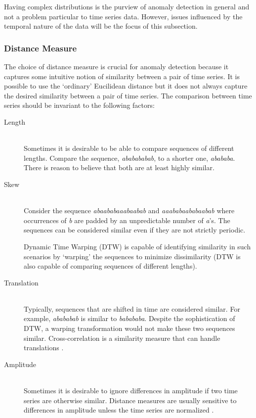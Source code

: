 Having complex distributions is the purview of anomaly detection in general and not a problem particular to time series data. However, issues influenced by the temporal nature of the data will be the focus of this subsection.

\subsubsection{Distance Measure}%

The choice of distance measure is crucial for anomaly detection because it captures some intuitive notion of similarity between a pair of time series. It is possible to use the `ordinary' Eucilidean distance \cite{Keogh2002} but it does not always capture the desired similarity between a pair of time series. The comparison between time series should be invariant to the following factors:

\begin{description}

\item[Length]  \hfill \\
%
Sometimes it is desirable to be able to compare sequences of different lengths. Compare the sequence, \emph{ababababab}, to a shorter one, \emph{abababa}. There is reason to believe that both are at least highly similar.

\item[Skew] \hfill \\
%
Consider the sequence \emph{abaababaaabaabab} and \emph{aaababaababaabab} where occurrences of \emph{b} are padded by an unpredictable number of \emph{a}'s. The sequences can be considered similar even if they are not strictly periodic.

Dynamic Time Warping (DTW) \cite{Keogh2002} is capable of identifying similarity in such scenarios by `warping' the sequences to minimize dissimilarity (DTW is also capable of comparing sequences of different lengths).

\item[Translation] \hfill \\
%
Typically, sequences that are shifted in time are considered similar. For example, \emph{abababab} is similar to \emph{babababa}. Despite the sophistication of DTW, a warping transformation would not make these two sequences similar.  Cross-correlation is a similarity measure that can handle translations \cite{Protopapas2005}.

\item[Amplitude] \hfill \\
%
Sometimes it is desirable to ignore differences in amplitude if two time series are otherwise similar. Distance measures are usually sensitive to differences in amplitude unless the time series are normalized \cite{Keogh2002}. 

\end{description}

